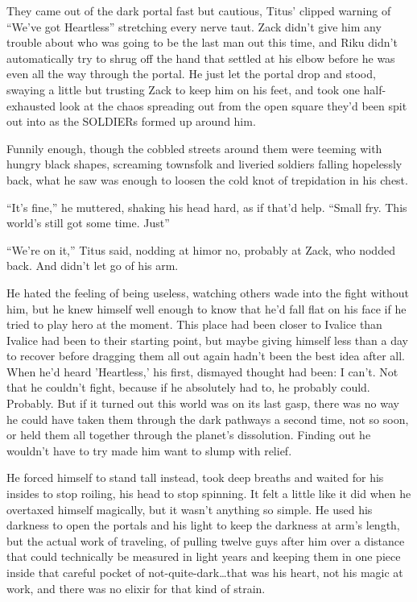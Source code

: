 \renewcommand{\pfbreakdisplay}{%
\ding{167}\quad\ding{167}\quad\ding{167}}

They came out of the dark portal fast but cautious, Titus' clipped warning of ``We've got Heartless'' stretching every nerve taut. Zack didn't give him any trouble about who was going to be the last man out this time, and Riku didn't automatically try to shrug off the hand that settled at his elbow before he was even all the way through the portal. He just let the portal drop and stood, swaying a little but trusting Zack to keep him on his feet, and took one half-exhausted look at the chaos spreading out from the open square they'd been spit out into as the SOLDIERs formed up around him.

Funnily enough, though the cobbled streets around them were teeming with hungry black shapes, screaming townsfolk and liveried soldiers falling hopelessly back, what he saw was enough to loosen the cold knot of trepidation in his chest.

``It's fine,'' he muttered, shaking his head hard, as if that'd help. ``Small fry. This world's still got some time. Just\textemdash ''

``We're on it,'' Titus said, nodding at him\textemdash or no, probably at Zack, who nodded back. And didn't let go of his arm.

He hated the feeling of being useless, watching others wade into the fight without him, but he knew himself well enough to know that he'd fall flat on his face if he tried to play hero at the moment. This place had been closer to Ivalice than Ivalice had been to their starting point, but maybe giving himself less than a day to recover before dragging them all out again hadn't been the best idea after all. When he'd heard 'Heartless,' his first, dismayed thought had been: I can't. Not that he couldn't fight, because if he absolutely had to, he probably could. Probably. But if it turned out this world was on its last gasp, there was no way he could have taken them through the dark pathways a second time, not so soon, or held them all together through the planet's dissolution. Finding out he wouldn't have to try made him want to slump with relief.

He forced himself to stand tall instead, took deep breaths and waited for his insides to stop roiling, his head to stop spinning. It felt a little like it did when he overtaxed himself magically, but it wasn't anything so simple. He used his darkness to open the portals and his light to keep the darkness at arm's length, but the actual work of traveling, of pulling twelve guys after him over a distance that could technically be measured in light years and keeping them in one piece inside that careful pocket of not-quite-dark\ldots that was his heart, not his magic at work, and there was no elixir for that kind of strain.

